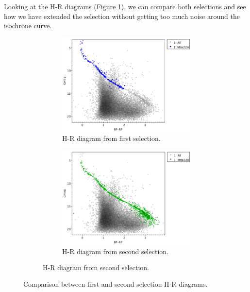 \documentclass[11pt, a4paper, english]{book}
\begin{document}
Looking at the H-R diagrams (Figure \ref{fig:clusterix_selection_hr_diagrams_melotte_22}),
we can compare both selections and see how we have extended the selection without
getting too much noise around the isochrone curve.

\begin{figure}[htbp]
  \centering
  \begin{subfigure}{0.9\textwidth}
    \centering
    \begin{subfigure}[t]{0.45\textwidth}
      \centering
      \includegraphics[width=\textwidth]{../figures/clusterix/topcat_1st_selection_hr_diagram_melotte_22.png}
      \caption{H-R diagram from first selection.}
    \end{subfigure}
    \hfill
    \begin{subfigure}[t]{0.45\textwidth}
      \centering
      \includegraphics[width=\textwidth]{../figures/clusterix/topcat_2nd_selection_hr_diagram_melotte_22.png}
      \caption{H-R diagram from second selection.}
    \end{subfigure}
  \end{subfigure}
  \caption{Comparison between first and second selection H-R diagrams.}
  \label{fig:clusterix_selection_hr_diagrams_melotte_22}
\end{figure}
\end{document}
